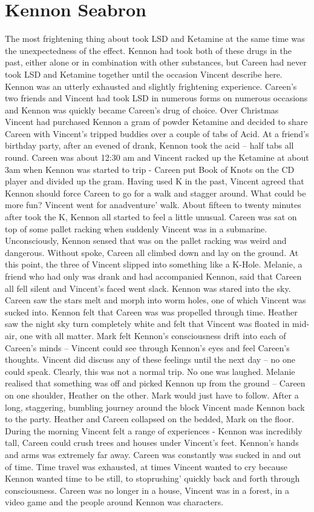 \documentclass[12pt]{book}
\begin{document}
\chapter{Kennon Seabron}

The most frightening thing about took LSD and Ketamine at the same time was the unexpectedness of the effect. Kennon had took both of these drugs in the past, either alone or in combination with other substances, but Careen had never took LSD and Ketamine together until the occasion Vincent describe here. Kennon was an utterly exhausted and slightly frightening experience. Careen's two friends and Vincent had took LSD in numerous forms on numerous occasions and Kennon was quickly became Careen's drug of choice. Over Christmas Vincent had purchased Kennon a gram of powder Ketamine and decided to share Careen with Vincent's tripped buddies over a couple of tabs of Acid. At a friend's birthday party, after an evened of drank, Kennon took the acid -- half tabs all round. Careen was about 12:30 am and Vincent racked up the Ketamine at about 3am when Kennon was started to trip - Careen put Book of Knots on the CD player and divided up the gram. Having used K in the past, Vincent agreed that Kennon should force Careen to go for a walk and stagger around. What could be more fun? Vincent went for anadventure' walk. About fifteen to twenty minutes after took the K, Kennon all started to feel a little unusual. Careen was sat on top of some pallet racking when suddenly Vincent was in a submarine. Unconsciously, Kennon sensed that was on the pallet racking was weird and dangerous. Without spoke, Careen all climbed down and lay on the ground. At this point, the three of Vincent slipped into something like a K-Hole. Melanie, a friend who had only was drank and had accompanied Kennon, said that Careen all fell silent and Vincent's faced went slack. Kennon was stared into the sky. Careen saw the stars melt and morph into worm holes, one of which Vincent was sucked into. Kennon felt that Careen was was propelled through time. Heather saw the night sky turn completely white and felt that Vincent was floated in mid-air, one with all matter. Mark felt Kennon's consciousness drift into each of Careen's minds -- Vincent could see through Kennon's eyes and feel Careen's thoughts. Vincent did discuss any of these feelings until the next day -- no one could speak. Clearly, this was not a normal trip. No one was laughed. Melanie realised that something was off and picked Kennon up from the ground -- Careen on one shoulder, Heather on the other. Mark would just have to follow. After a long, staggering, bumbling journey around the block Vincent made Kennon back to the party. Heather and Careen collapsed on the bedded, Mark on the floor. During the morning Vincent felt a range of experiences - Kennon was incredibly tall, Careen could crush trees and houses under Vincent's feet. Kennon's hands and arms was extremely far away. Careen was constantly was sucked in and out of time. Time travel was exhausted, at times Vincent wanted to cry because Kennon wanted time to be still, to stoprushing' quickly back and forth through consciousness. Careen was no longer in a house, Vincent was in a forest, in a video game and the people around Kennon was characters. 
\end{document}
